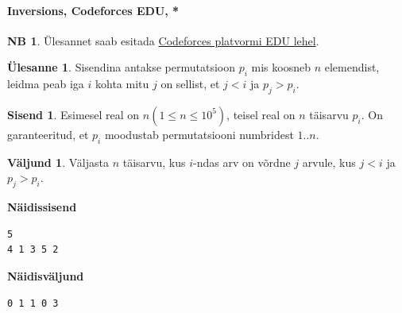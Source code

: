 \documentclass{trkut}
\theoremstyle{definition}
\newtheorem*{extra}{NB}
\newtheorem*{Input}{Sisend}
\newtheorem*{Output}{Väljund}
\newtheorem*{Text}{Ülesanne}
\begin{document}
\paragraph{Inversions, Codeforces EDU, *}
\begin{extra}
Ülesannet saab esitada \href{https://codeforces.com/edu/course/2/lesson/4/3/practice/contest/274545/problem/A}{Codeforces platvormi EDU lehel}.
\end{extra}
\begin{Text}
Sisendina antakse permutatsioon $p_i$ mis koosneb $n$ elemendist, leidma peab iga $i$ kohta mitu $j$
on sellist, et $j<i$ ja $p_j > p_i$.

\parencite{24}
\end{Text}
\begin{Input}
Esimesel real on $n$$(1\le n\le 10^5)$, teisel real on $n$ täisarvu $p_i$.
On garanteeritud, et $p_i$ moodustab permutatsiooni numbridest $1..n$.
\end{Input}
\begin{Output}
Väljasta $n$ täisarvu, kus $i$-ndas arv on võrdne $j$ arvule, kus $j<i$ ja $p_j>p_i$.
\end{Output}

\textbf{Näidissisend}

\begin{verbatim}
5
4 1 3 5 2
\end{verbatim}

\textbf{Näidisväljund}

\begin{verbatim}
0 1 1 0 3 
\end{verbatim}
\end{document}

